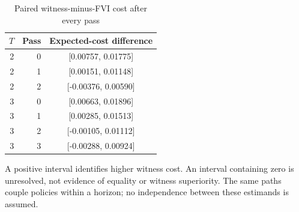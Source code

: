 \begin{table}[htbp]
\centering
\caption{Paired witness-minus-FVI cost after every pass}\label{tab:cross-method54}
{\small\setlength{\tabcolsep}{4pt}
\begin{tabular}{rrc}
\hline
$T$ & Pass & Expected-cost difference \\
\hline
2 & 0 & [0.00757, 0.01775] \\
2 & 1 & [0.00151, 0.01148] \\
2 & 2 & [-0.00376, 0.00590] \\
3 & 0 & [0.00663, 0.01896] \\
3 & 1 & [0.00285, 0.01513] \\
3 & 2 & [-0.00105, 0.01112] \\
3 & 3 & [-0.00288, 0.00924] \\
\hline
\end{tabular}}
\par\smallskip
{\footnotesize A positive interval identifies higher witness cost. An interval containing zero is unresolved, not evidence of equality or witness superiority. The same paths couple policies within a horizon; no independence between these estimands is assumed.}
\end{table}
